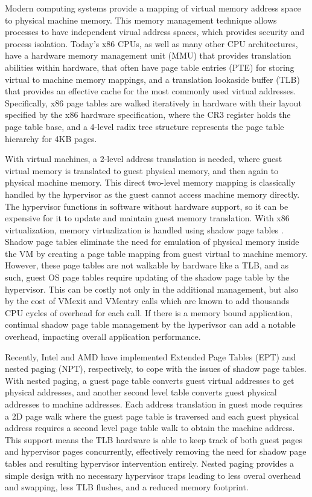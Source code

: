 Modern computing systems provide a mapping of virtual memory address space to physical machine memory. This memory management technique allows processes to have independent virual address spaces, which provides security and process isolation.  Today's x86 CPUs, as well as many other CPU architectures, have a hardware memory management unit (MMU) that provides translation abilities within hardware, that often have page table entries (PTE) for storing virtual to machine memory mappings, and a translation lookaside buffer (TLB) that provides an effective cache for the most commonly used virtual addresses.  Specifically, x86 page tables are walked iteratively in hardware with their layout specified by the x86 hardware specification, where the CR3 register holds the page table base, and a 4-level radix tree structure represents the page table hierarchy for 4KB pages.  

With virtual machines, a 2-level address translation is needed, where guest virtual memory is translated to guest physical memory, and then again to physical machine memory. This direct two-level memory mapping is classically handled by the hypervisor as the guest cannot access machine memory directly. The hypervisor functions in software without hardware support, so it can be expensive for it to update and maintain guest memory translation. With x86 virtualization, memory virtualization is handled using shadow page tables \cite{rosenblum2005virtual}. Shadow page tables eliminate the need for emulation of physical memory inside the VM by creating a page table mapping from guest virtual to machine memory. However, these page tables are not walkable by hardware like a TLB, and as such, guest OS page tables require updating of the shadow page table by the hypervisor. This can be costly not only in the additional management, but also by the cost of VMexit and VMentry calls which are known to add thousands CPU cycles of overhead for each call.  If there is a memory bound application, continual shadow page table management by the hyperivsor can add a notable overhead, impacting overall application performance.

Recently, Intel and AMD have implemented Extended Page Tables (EPT) and nested paging (NPT), respectively, to cope with the issues of shadow page tables.  With nested paging, a guest page table converts guest virtual addresses to get physical addresses, and another second level table converts guest physical addresses to machine addresses.  Each address translation in guest mode requires a 2D page walk where the guest page table is traversed and each guest physical address requires a second level page table walk to obtain the machine address. This support means the TLB hardware is able to keep track of both guest pages and hypervisor pages concurrently, effectively removing the need for shadow page tables and resulting hypervisor intervention entirely.  Nested paging provides a simple design with no necessary hypervisor traps leading to less overal overhead and swapping, less TLB flushes, and a reduced memory footprint.

